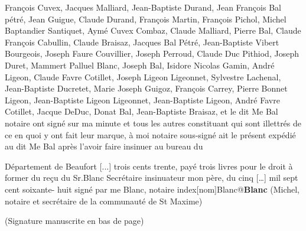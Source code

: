 \documentclass[a4paper,twoside,openany]{article}
\begin{document}

François Cuvex, 
Jacques Malliard, 
Jean-Baptiste Durand, 
Jean François Bal pétré, 
Jean Guigue, 
Claude Durand, 
François Martin, 
François Pichol, 
Michel Baptandier Santiquet, 
Aymé Cuvex Combaz, 
Claude Malliard, 
Pierre Bal, 
Claude François Cabullin, 
Claude Braisaz, 
Jacques Bal Pétré, 
Jean-Baptiste Vibert Bourgeois, 
Joseph Faure Couvillier, 
Joseph Perroud, 
Claude Duc Pithiod, 
Joseph Duret, 
Mammert Palluel Blanc, 
Joseph Bal, 
Isidore Nicolas Gamin, 
André Ligeon, 
Claude Favre Cotillet, 
Joseph Ligeon Ligeonnet, 
Sylvestre Lachenal, 
Jean-Baptiste Ducretet, 
Marie Joseph Guigoz, 
François Carrey, 
Pierre Bonnet Ligeon, 
Jean-Baptiste Ligeon Ligeonnet, 
Jean-Baptiste Ligeon, 
André Favre Cotillet, 
Jacque DeDuc, 
Donat Bal, 
Jean-Baptiste Braisaz,
et le dit Me Bal notaire ont signé sur ma minute
et tous les autres constituant qui sont illettrés
de ce en quoi y ont fait leur marque, à moi notaire
sous-signé ait le présent expédié au dit Me Bal
après l’avoir faire insinuer au bureau du



Département de Beaufort [...]  trois cents
trente, payé trois livres pour le droit à former du
reçu du Sr.Blanc Secrétaire insinuateur
mon père, du cinq […] mil sept cent soixante-
huit signé par me Blanc, notaire index[nom]{Blanc@\textbf{Blanc} (Michel, notaire et secrétaire de la communauté de St Maxime) }

(Signature manuscrite en bas de page)











\printindex[nom]
\newpage
\printglossary
\newpage
\printbibliography
\end{document}
